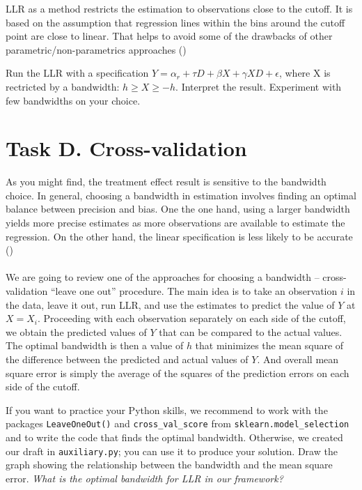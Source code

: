  LLR as a method restricts the estimation to observations close to the cutoff. It is based on the assumption that  regression lines within the bins around the cutoff point are close to linear. That helps to avoid some of the drawbacks of other parametric/non-parametrics approaches (\cite{Lee.2010})

\begin{boenumerate}

\item Run the LLR with a specification $Y = \alpha_r + \tau D + \beta X + \gamma X D + \epsilon$, where X is rectricted by a bandwidth: $h \geq X \geq -h$. Interpret the result. Experiment with few bandwidths on your choice.

\end{boenumerate}

\section*{Task D. Cross-validation}

As you might find, the treatment effect result is sensitive to the bandwidth choice. In general, choosing a bandwidth in estimation involves finding an optimal balance between precision and bias. One the one hand, using a larger bandwidth yields more precise estimates as more observations are available to estimate the regression. On the other hand, the linear specification is less likely to be accurate (\cite{Lee.2010})\\
\\
We are going to review one of the approaches for choosing a bandwidth --  cross-validation “leave one out” procedure. The main idea is to take an observation $i$ in the data, leave it out, run LLR, and use the estimates to predict the value of $Y$ at $X = X_i$.  Proceeding with each observation separately on each side of the cutoff, we obtain the predicted values of $Y$ that can be compared to the actual values. The optimal bandwidth is then a value of $h$ that minimizes the mean square of the difference between the predicted and actual values of $Y$. And overall mean square error is simply the average of the squares of the prediction errors  on each side of the cutoff.

\begin{boenumerate}

\item If you want to practice your Python skills, we recommend to work with the packages \texttt{LeaveOneOut()} and \texttt{cross\_val\_score} from \texttt{sklearn.model\_selection} and to write the code that finds the optimal bandwidth. Otherwise, we created our draft in \texttt{auxiliary.py}; you can use it to produce your solution. Draw the graph showing the relationship between the bandwidth and the mean square error. \emph{What is the optimal bandwidth for LLR in our framework?}

\end{boenumerate}






